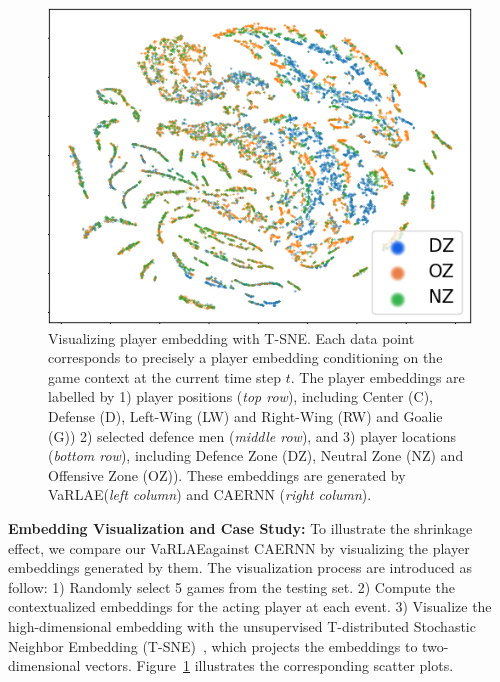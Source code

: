 \documentclass[letterpaper]{article} %
\newcommand{\latentvariables}{\mathbf{z}}
\newcommand{\system}{VaRLAE\;}
\begin{document}
\begin{figure}[htbp]
\begin{minipage}[b]{.5\columnwidth}
    \end{minipage}%
    \begin{minipage}[b]{.5\columnwidth}
        \centering
        \includegraphics[width=0.95\columnwidth]{./figures/embedding-visualization-caernn-zone.png}
    \end{minipage}%
    \caption{Visualizing player embedding with T-SNE. Each data point corresponds to precisely a player embedding conditioning on the game context at the current %
    time step $t$.  
    The player embeddings are labelled by 1) player positions ({\it top row}), including Center (C), Defense (D), Left-Wing (LW) and Right-Wing (RW) and Goalie (G)) 2) selected defence men ({\it middle row}), and 3) player locations ({\it bottom row}), including Defence Zone (DZ), Neutral Zone (NZ) and Offensive Zone (OZ)). These embeddings are generated by \system ({\it left column}) and CAERNN ({\it right column}).
    } 
    \label{fig:embedding-visualization}%
    \vspace{-0.05in}
\end{figure}

{\bf Embedding Visualization and Case Study:}
To illustrate the shrinkage effect, we compare our \system against CAERNN by visualizing the player embeddings generated by them. The visualization process are introduced as follow: 1) Randomly select 5 games from the testing set. 2) Compute the contextualized embeddings 
for the acting player at each event. 3) Visualize the high-dimensional embedding with the unsupervised T-distributed Stochastic Neighbor Embedding (T-SNE)~\cite{maaten2008visualizing}, which projects the embeddings to two-dimensional vectors. 
Figure~\ref{fig:embedding-visualization} illustrates the corresponding scatter plots.  
\end{document}
